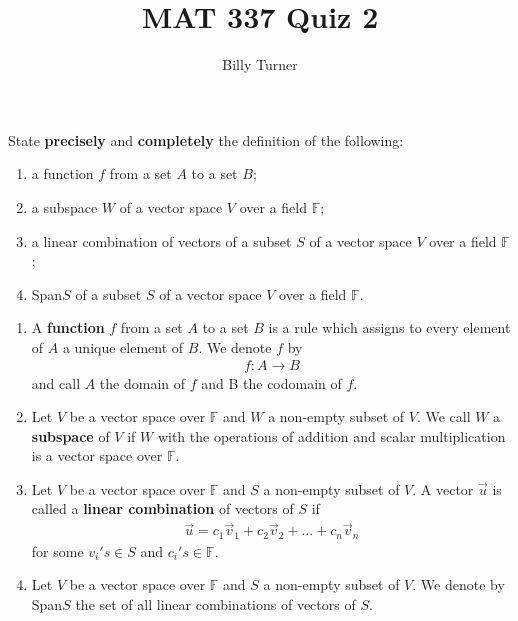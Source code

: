 \documentclass[12pt,answers]{exam}
\newenvironment{problem}[2][Problem]{\begin{trivlist}
\item[\hskip \labelsep {\bfseries #1}\hskip \labelsep {\bfseries #2.}]}{\end{trivlist}}
\begin{document}
\title{MAT 337 Quiz 2} 
\author{Billy Turner}
\maketitle
\thispagestyle{empty}

\begin{problem}{1}
State \textbf{precisely} and \textbf{completely} the definition of the following:
\begin{enumerate}[label=(\alph*)]
\item a function $f$ from a set $A$ to a set $B$;
\item a subspace $W$ of a vector space $V$ over a field $\mathbb{F}$;
\item a linear combination of vectors of a subset $S$ of a vector space $V$ over a field $\mathbb{F}$;
\item Span$S$ of a subset $S$ of a vector space $V$ over a field $\mathbb{F}$.
\end{enumerate}
\end{problem}

\begin{solution}
\begin{enumerate}[label=(\alph*)]
\item A \textbf{function} $f$ from a set $A$ to a set $B$ is a rule which assigns to every element of $A$ a unique element of $B$. We denote $f$ by
\begin{align*}
f:A\rightarrow B
\end{align*}
and call $A$ the domain of $f$ and B the codomain of $f$.
\item Let $V$ be a vector space over $\mathbb{F}$ and $W$ a non-empty subset of $V$. We call $W$ a \textbf{subspace} of $V$ if $W$ with the operations of addition and scalar multiplication is a vector space over $\mathbb{F}$.
\item Let $V$ be a vector space over $\mathbb{F}$ and $S$ a non-empty subset of $V$. A vector $\vec{u}$ is called a \textbf{linear combination} of vectors of $S$ if
\begin{align*}
\vec{u}=c_{1}\vec{v}_{1}+c_{2}\vec{v}_{2}+...+c_{n}\vec{v}_{n}
\end{align*}
for some $v_{i}'s\in S$ and $c_{i}'s\in \mathbb{F}$. 
\item Let $V$ be a vector space over $\mathbb{F}$ and $S$ a non-empty subset of $V$. We denote by Span$S$ the set of all linear combinations of vectors of $S$. 
\end{enumerate}
\end{solution}
\end{document}
